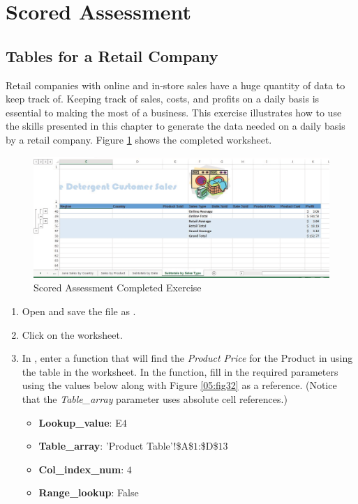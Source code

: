 \begin{enumerate}
\end{enumerate}

\section{Scored Assessment}

\subsection{Tables for a Retail Company}

Retail companies with online and in-store sales have a huge quantity of data to keep track of. Keeping track of sales, costs, and profits on a daily basis is essential to making the most of a business. This exercise illustrates how to use the skills presented in this chapter to generate the data needed on a daily basis by a retail company. Figure \ref{05:fig31} shows the completed worksheet.

\begin{figure}[H]
	\centering
	\includegraphics[width=\maxwidth{.95\linewidth}]{gfx/ch05_fig31}
	\caption{Scored Assessment Completed Exercise}
	\label{05:fig31}
\end{figure}

\begin{enumerate}
	\item Open  and save the file as .
	\item Click on the  worksheet.
	\item In , enter a  function that will find the \textit{Product Price} for the Product in  using the table in the  worksheet. In the  function, fill in the required parameters using the values below along with Figure \ref{05:fig32} as a reference. (Notice that the \textit{Table\_array} parameter uses absolute cell references.)
	
	\begin{itemize}
		\item \textbf{Lookup\_value}: E$ 4 $
		\item \textbf{Table\_array}: 'Product Table'!\$A\$$ 1 $:\$D\$$ 13 $
		\item \textbf{Col\_index\_num}: $ 4 $
		\item \textbf{Range\_lookup}: False
	\end{itemize}
	
\end{enumerate}

